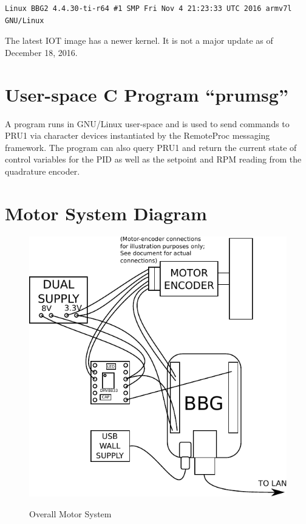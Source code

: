 \begin{verbatim}
Linux BBG2 4.4.30-ti-r64 #1 SMP Fri Nov 4 21:23:33 UTC 2016 armv7l GNU/Linux
\end{verbatim}

The latest IOT image has a newer kernel.  It is not a major update as of December 18, 2016.

\section{User-space C Program ``prumsg''}

A program runs in GNU/Linux user-space and is used to send commands to PRU1 via character devices instantiated by the RemoteProc messaging framework.  The program can also query PRU1 and return the current state of control variables for the PID as well as the setpoint and RPM reading from the quadrature encoder.

\section{Motor System Diagram}

\begin{figure}[H]
	\centering
	\includegraphics[width=1.0\textwidth]{diagrams/motor_system}
	\centering\bfseries
	\caption{Overall Motor System}
\end{figure}





